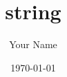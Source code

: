 \documentclass{article}
\begin{document}
\title{string}
\author{Your Name}
\date{\today}
\maketitle

\end{document}
